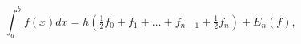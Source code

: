 \[\displaystyle\int_{a}^{b}f(x)dx=h(\tfrac{1}{2}f_{0}+f_{1}+\dots+f_{n-1}+\tfrac%
{1}{2}f_{n})+E_{n}(f),\]